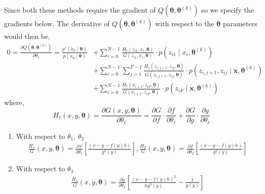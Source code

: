 \documentclass[12pt]{article}
\newcommand{\bx}{\ensuremath{\mathbf{x}}}
\newcommand{\btheta}{\ensuremath{\boldsymbol{\theta}}}
\begin{document}
Since both these methods require the gradient of $Q(\btheta, \btheta^{(k)})$ so we specify the gradients below. The derivative of $Q(\btheta, \btheta^{(k)})$ with respect to the $\btheta$ parameters would then be,
\begin{align*}
0 = \frac{\partial Q(\btheta, \btheta^{(k)})}{\partial \theta_{\ell}} = \frac{p'(x_0 \mid \btheta)}{p(x_0 \mid \btheta)} & + \sum_{i=0}^{N-1} \frac{H_{\ell}(z_{i1}, x_i, \btheta)}{G(z_{i1}, x_i, \btheta)} \cdot p(z_{i1} \mid x_i, \btheta^{(k)}) \\
& + \sum_{i=0}^{N-1} \sum_{j=1}^{F-1} \frac{H_{\ell}(z_{i,j+1}, z_{ij}, \btheta)}{G(z_{i,j+1}, z_{ij}, \btheta)} \cdot p(z_{i,j+1}, z_{ij} \mid \bx, \btheta^{(k)}) \nonumber \\
& + \sum_{i=0}^{N-1} \frac{H_{\ell}(x_{i+1}, z_{iF}, \btheta)}{G(x_{i+1}, z_{iF}, \btheta)} \cdot p(z_{iF} \mid \bx, \btheta^{(k)})
\end{align*}
where, $$H_{\ell}(x,y,\btheta) = \frac{\partial G(x,y,\btheta)}{\partial \theta_{\ell}} = \frac{\partial G}{\partial f}\cdot \frac{\partial f}{\partial \theta_{\ell}} + \frac{\partial G}{\partial g} \cdot \frac{\partial g}{\partial \theta_{\ell}} $$
\begin{enumerate}
\item With respect to $\theta_1$, $\theta_2$
\begin{align*}
\frac{H_{1}}{G}(x,y,\btheta) = \frac{\partial f}{\partial \theta_1} \left[ \frac{(x - y - f(y)h)}{g^2(y)} \right], \frac{H_{2}}{G}(x,y,\btheta) = \frac{\partial f}{\partial \theta_2} \left[ \frac{(x - y - f(y)h)}{g^2(y)} \right]
\end{align*}
\item With respect to $\theta_3$
\begin{align*}
\frac{H_{3}}{G}(x,y,\btheta) = \frac{\partial g}{\partial \theta_3} \left[ \frac{(x - y - f(y)h)^2}{h g^3(y)} - \frac{1}{g(y)} \right]
\end{align*}
\end{enumerate}
\end{document}
